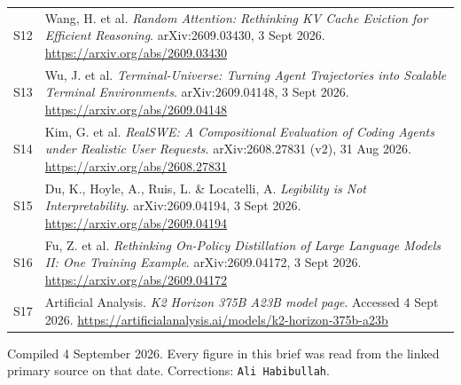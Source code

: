 \documentclass[11pt,a4paper]{article}
\newcommand{\briefdate}{4 September 2026}
\newcommand{\briefauthor}{Ali Habibullah}
\begin{document}
{\begin{tabularx}{\textwidth}{@{}l X@{}}
S12 & Wang, H. et al. \emph{Random Attention: Rethinking KV Cache Eviction for Efficient Reasoning}. arXiv:2609.03430, 3 Sept 2026. \url{https://arxiv.org/abs/2609.03430} \\
S13 & Wu, J. et al. \emph{Terminal-Universe: Turning Agent Trajectories into Scalable Terminal Environments}. arXiv:2609.04148, 3 Sept 2026. \url{https://arxiv.org/abs/2609.04148} \\
S14 & Kim, G. et al. \emph{RealSWE: A Compositional Evaluation of Coding Agents under Realistic User Requests}. arXiv:2608.27831 (v2), 31 Aug 2026. \url{https://arxiv.org/abs/2608.27831} \\
S15 & Du, K., Hoyle, A., Ruis, L. \& Locatelli, A. \emph{Legibility is Not Interpretability}. arXiv:2609.04194, 3 Sept 2026. \url{https://arxiv.org/abs/2609.04194} \\
S16 & Fu, Z. et al. \emph{Rethinking On-Policy Distillation of Large Language Models II: One Training Example}. arXiv:2609.04172, 3 Sept 2026. \url{https://arxiv.org/abs/2609.04172} \\
S17 & Artificial Analysis. \emph{K2 Horizon 375B A23B model page}. Accessed 4 Sept 2026. \url{https://artificialanalysis.ai/models/k2-horizon-375b-a23b} \\
\bottomrule
\end{tabularx}}

\vspace{0.8em}
{\footnotesize\color{brandgrey}
Compiled \briefdate. Every figure in this brief was read from the linked primary
source on that date. Corrections: \texttt{\briefauthor}.}
\end{document}
